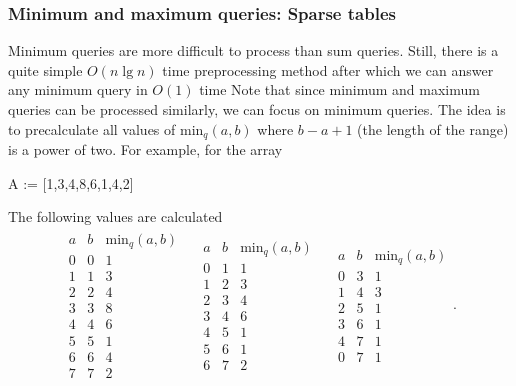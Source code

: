 \documentclass{report}
\begin{document}
    \subsubsection{Minimum and maximum queries: Sparse tables}
    \bigbreak \noindent 
    Minimum queries are more difficult to process than sum queries. Still, there is a quite simple $O(n \lg n)$ time preprocessing method after which we can answer any minimum query in $O(1)$ time
    \bigbreak \noindent 
    Note that since minimum and maximum queries can be processed similarly, we can focus on minimum queries.
    \bigbreak \noindent 
    The idea is to precalculate all values of $\text{min}_{q}(a,b)$ where $b - a +1$ (the length of the range) is a power of two. For example, for the array
    \bigbreak \noindent 
    \begin{center}
        A := [1,3,4,8,6,1,4,2]
    \end{center}
    \bigbreak \noindent 
    The following values are calculated
    \bigbreak \noindent 
    \begin{align*}
        \begin{array}{ccc}
            a &b &\text{min}_{q}(a,b) \\
            \hline
            0 &0 &1\\
            1 &1 &3\\
            2 &2 &4\\
            3 &3 &8\\
            4 &4 &6\\
            5 &5 &1\\
            6 &6 &4\\
            7 &7 &2 
        \end{array}
        \quad
        \begin{array}{ccc}
            a &b &\text{min}_{q}(a,b)\\
            \hline
            0 &1 &1\\
            1 &2 &3\\
            2 &3 &4\\
            3 &4 &6\\
            4 &5 &1\\
            5 &6 &1\\
            6 &7 &2
        \end{array}
        \quad
        \begin{array}{ccc}
            a &b &\text{min}_{q}(a,b) \\
            \hline
            0 &3 &1\\
            1 &4 &3\\
            2 &5 &1\\
            3 &6 &1\\
            4 &7 &1\\
            0 &7 &1
        \end{array}
    .\end{align*}
\end{document}
